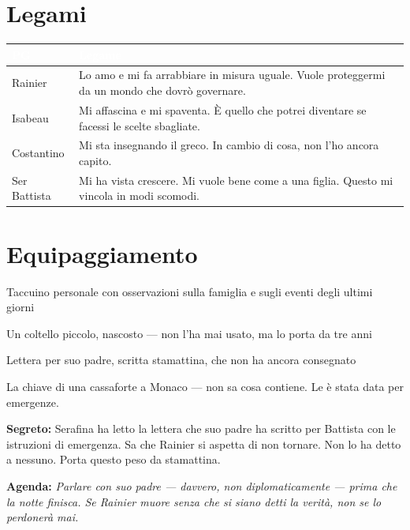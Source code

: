 \section*{Legami}
\begin{table}[h]\centering\renewcommand{\arraystretch}{1.4}
\begin{tabularx}{\linewidth}{@{}L{2.6cm} X@{}}
\toprule{}
\textcolor{white}{\textbf{PG}} & \textcolor{white}{\textbf{Legame}} \\
\midrule
Rainier & Lo amo e mi fa arrabbiare in misura uguale. Vuole proteggermi da un mondo che dovr\`o governare. \\
Isabeau & Mi affascina e mi spaventa. \`E quello che potrei diventare se facessi le scelte sbagliate. \\
Costantino & Mi sta insegnando il greco. In cambio di cosa, non l'ho ancora capito. \\
Ser Battista & Mi ha vista crescere. Mi vuole bene come a una figlia. Questo mi vincola in modi scomodi. \\
\bottomrule
\end{tabularx}
\end{table}

\section*{Equipaggiamento}
\begin{goldlist}
\item Taccuino personale con osservazioni sulla famiglia e sugli eventi degli ultimi giorni
\item Un coltello piccolo, nascosto --- non l'ha mai usato, ma lo porta da tre anni
\item Lettera per suo padre, scritta stamattina, che non ha ancora consegnato
\item La chiave di una cassaforte a Monaco --- non sa cosa contiene. Le \`e stata data per emergenze.
\end{goldlist}

\clearpage
\begin{secretbox}
\textbf{Segreto:} Serafina ha letto la lettera che suo padre ha scritto per Battista con le istruzioni di emergenza. Sa che Rainier si aspetta di non tornare. Non lo ha detto a nessuno. Porta questo peso da stamattina.

\medskip\noindent\textcolor{SecretRed}{\textbf{Agenda:}} \textit{Parlare con suo padre --- davvero, non diplomaticamente --- prima che la notte finisca. Se Rainier muore senza che si siano detti la verit\`a, non se lo perdoner\`a mai.}
\end{secretbox}
